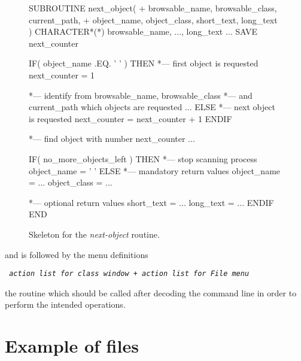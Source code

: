 \begin{figure}[htb]
\begin{XMP}
      SUBROUTINE next_object(
     +   browsable_name, browsable_class, current_path,
     +   object_name, object_class, short_text, long_text )
      CHARACTER*(*) browsable_name, ..., long_text
         ...
      SAVE next_counter

      IF( object_name .EQ. ' ' ) THEN
*--- first object is requested
         next_counter = 1

*--- identify from browsable_name, browsable_class
*--- and current_path which objects are requested
            ...
      ELSE
*--- next object is requested
         next_counter = next_counter + 1
      ENDIF

*--- find object with number next_counter
         ...

      IF( no_more_objects_left ) THEN
*--- stop scanning process
         object_name = ' '
      ELSE
*--- mandatory return values
         object_name = ...
         object_class = ...

*--- optional return values
         short_text = ...
         long_text = ...
      ENDIF
      END
\end{XMP}
\caption{Skeleton for the \textsl{next-object} routine.
\label{fig-next-object}}
\end{figure}

and is followed
by the menu definitions
\begin{XMP}\tt
\textsl{action list for class window} 
+ 
\textsl{action list for File menu}
\end{XMP}

the routine which should be called after decoding the command line in
order to perform the intended operations.



\section{Example of \CDF{} files}

